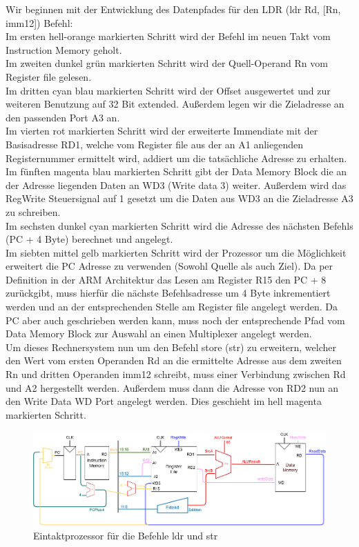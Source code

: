 \documentclass[a4paper,12pt,leqno]{article}
\begin{document}
Wir beginnen mit der Entwicklung des Datenpfades für den LDR (ldr Rd, [Rn, imm12]) Befehl:\\
Im ersten \textcolor[rgb]{1, 0.7098, 0.4392}{hell-orange} markierten Schritt wird der Befehl im neuen Takt vom Instruction Memory geholt.\\
Im zweiten \textcolor[rgb]{0.1765,0.4627,0}{dunkel grün} markierten Schritt wird der Quell-Operand Rn vom Register file gelesen.\\
Im dritten \textcolor[rgb]{0,0.4314,0.6863}{cyan blau} markierten Schritt wird der Offset ausgewertet und zur weiteren Benutzung auf 32 Bit extended. Außerdem legen wir die Zieladresse an den passenden Port A3 an.\\
Im vierten \textcolor[rgb]{1,0,0}{rot} markierten Schritt wird der erweiterte Immendiate mit der Basisadresse RD1, welche vom Register file aus der an A1 anliegenden Registernummer ermittelt wird, addiert um die tatsächliche Adresse zu erhalten.\\
Im fünften \textcolor[rgb]{0.2,0.2,1}{magenta blau} markierten Schritt gibt der Data Memory Block die an der Adresse liegenden Daten an WD3 (Write data 3) weiter. Außerdem wird das RegWrite Steuersignal auf 1 gesetzt um die Daten aus WD3 an die Zieladresse A3 zu schreiben.\\
Im sechsten \textcolor[rgb]{0,0.4,0.4}{dunkel cyan} markierten Schritt wird die Adresse des nächsten Befehls (PC + 4 Byte) berechnet und angelegt.\\
Im siebten \textcolor[rgb]{1,0.851,0.4}{mittel gelb} markierten Schritt wird der Prozessor um die Möglichkeit erweitert die PC Adresse zu verwenden (Sowohl Quelle als auch Ziel). Da per Definition in der ARM Architektur das Lesen am Register R15 den PC + 8 zurückgibt, muss hierfür die nächste Befehlsadresse um 4 Byte inkrementiert werden und an der entsprechenden Stelle am Register file angelegt werden. Da PC aber auch geschrieben werden kann, muss noch der entsprechende Pfad vom Data Memory Block zur Auswahl an einen Multiplexer angelegt werden.\\

Um dieses Rechnersystem nun um den Befehl store (str) zu erweitern, welcher den Wert vom ersten Operanden Rd an die ermittelte Adresse aus dem zweiten Rn und dritten Operanden imm12 schreibt, muss einer Verbindung zwischen Rd und A2 hergestellt werden. Außerdem muss dann die Adresse von RD2 nun an den Write Data WD Port angelegt werden. Dies geschieht im \textcolor[rgb]{1,0.6,1}{hell magenta} markierten Schritt.
\begin{figure}[h!]
\centering
\includegraphics[scale=0.51]{Grafiken/strEintakt.jpg}
\caption{Eintaktprozessor für die Befehle ldr und str}
\end{figure}
\end{document}
